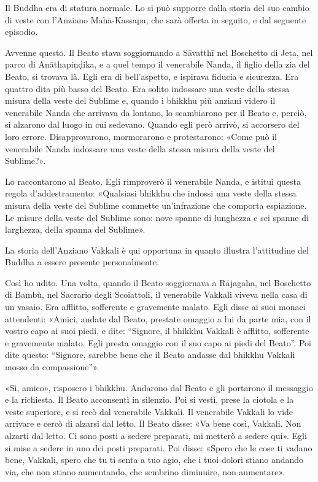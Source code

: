 

 Il Buddha era di statura normale. Lo si può supporre
dalla storia del suo cambio di veste con l’Anziano Mahā-Kassapa, che
sarà offerta in seguito, e dal seguente episodio.


 Avvenne questo. Il Beato stava soggiornando a Sāvatthī nel
Boschetto di Jeta, nel parco di Anāthapiṇḍika, e a quel tempo il
venerabile Nanda, il figlio della zia del Beato, si trovava là. Egli era
di bell’aspetto, e ispirava fiducia e sicurezza. Era quattro dita più
basso del Beato. Era solito indossare una veste della stessa misura
della veste del Sublime e, quando i bhikkhu più anziani videro il
venerabile Nanda che arrivava da lontano, lo scambiarono per il Beato e,
perciò, si alzarono dal luogo in cui sedevano. Quando egli però arrivò,
si accorsero del loro errore. Disapprovarono, mormorarono e
protestarono: «Come può il venerabile Nanda indossare una veste della
stessa misura della veste del Sublime?».


Lo raccontarono al Beato. Egli rimproverò il venerabile Nanda, e istituì
questa regola d’addestramento: «Qualsiasi bhikkhu che indossi una veste
della stessa misura della veste del Sublime commette un’infrazione che
comporta espiazione. Le misure della veste del Sublime sono: nove spanne
di lunghezza e sei spanne di larghezza, della spanna del Sublime».




 La storia dell’Anziano Vakkali è qui opportuna in
quanto illustra l’attitudine del Buddha a essere presente personalmente.


 Così ho udito. Una volta, quando il Beato soggiornava a
Rājagaha, nel Boschetto di Bambù, nel Sacrario degli Scoiattoli, il
venerabile Vakkali viveva nella casa di un vasaio. Era afflitto,
sofferente e gravemente malato. Egli disse ai suoi monaci attendenti:
«Amici, andate dal Beato, prestate omaggio a lui da parte mia, con il
vostro capo ai suoi piedi, e dite: “Signore, il bhikkhu Vakkali è
afflitto, sofferente e gravemente malato. Egli presta omaggio con il suo
capo ai piedi del Beato”. Poi dite questo: “Signore, sarebbe bene che il
Beato andasse dal bhikkhu Vakkali mosso da compassione”».


«Sì, amico», risposero i bhikkhu. Andarono dal Beato e gli portarono il
messaggio e la richiesta. Il Beato acconsentì in silenzio. Poi si vestì,
prese la ciotola e la veste superiore, e si recò dal venerabile Vakkali.
Il venerabile Vakkali lo vide arrivare e cercò di alzarsi dal letto. Il
Beato disse: «Va bene così, Vakkali. Non alzarti dal letto. Ci sono
posti a sedere preparati, mi metterò a sedere qui». Egli si mise a
sedere in uno dei posti preparati. Poi disse: «Spero che le cose ti
vadano bene, Vakkali, spero che tu ti senta a tuo agio, che i tuoi
dolori stiano andando via, che non stiano aumentando, che sembrino
diminuire, non aumentare».


